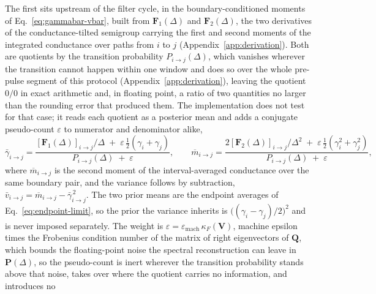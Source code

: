 The first sits upstream of the filter cycle, in the boundary-conditioned
moments of Eq.~\ref{eq:gammabar-vbar}, built from $\mathbf{F}_1(\Delta)$ and
$\mathbf{F}_2(\Delta)$, the two derivatives of the conductance-tilted semigroup carrying the
first and second moments of the integrated conductance over paths from $i$ to $j$
(Appendix~\ref{app:derivation}). Both are quotients by the transition probability
$P_{i\to j}(\Delta)$, which vanishes wherever the transition cannot happen within one window and
does so over the whole pre-pulse segment of this protocol
(Appendix~\ref{app:derivation}), leaving the quotient $0/0$ in exact arithmetic and, in floating
point, a ratio of two quantities no larger than the rounding error that produced them. The
implementation does not test for that case; it reads each quotient as a posterior mean and
adds a conjugate pseudo-count $\varepsilon$ to numerator and denominator alike,
\begin{equation}
  \bar{\gamma}_{i\to j}
    = \frac{[\mathbf{F}_1(\Delta)]_{i\to j}/\Delta
            \;+\; \varepsilon\,\tfrac12(\gamma_{i}+\gamma_{j})}
           {P_{i\to j}(\Delta)\;+\;\varepsilon},
  \qquad
  \overline{m}_{i\to j}
    = \frac{2[\mathbf{F}_2(\Delta)]_{i\to j}/\Delta^{2}
            \;+\; \varepsilon\,\tfrac12(\gamma^2_{i}+\gamma^2_{j})}
           {P_{i\to j}(\Delta)\;+\;\varepsilon},
  \label{eq:pseudocount}
\end{equation}
where $\overline{m}_{i\to j}$ is the second moment of the interval-averaged
conductance over the same boundary pair, and the variance follows by subtraction,
$\bar{v}_{i\to j}=\overline{m}_{i\to j}-\bar{\gamma}^{\,2}_{i\to j}$.
The two prior means are the endpoint averages of Eq.~\ref{eq:endpoint-limit}, so the prior the
variance inherits is $\bigl((\gamma_{i}-\gamma_{j})/2\bigr)^2$ and is never imposed
separately. The weight is $\varepsilon=\varepsilon_{\mathrm{mach}}\,\kappa_F(\mathbf{V})$,
machine epsilon times the Frobenius condition number of the matrix of right eigenvectors of
$\mathbf{Q}$, which bounds the floating-point noise the spectral reconstruction can leave in
$\mathbf{P}(\Delta)$, so the pseudo-count is inert wherever the transition probability stands
above that noise, takes over where the quotient carries no information, and introduces no
